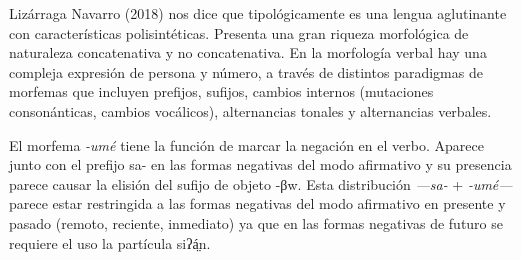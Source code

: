 Lizárraga Navarro (2018) nos dice que tipológicamente es una lengua aglutinante con características polisintéticas. Presenta una gran riqueza morfológica de naturaleza concatenativa y no concatenativa. En la morfología verbal hay una compleja expresión de persona y número, a través de distintos paradigmas de morfemas que incluyen prefijos, sufijos, cambios internos (mutaciones consonánticas, cambios vocálicos), alternancias tonales y alternancias verbales.

El morfema \textit{-umé} tiene la función de marcar la negación en el verbo. Aparece junto con el prefijo sa- en las formas negativas del modo afirmativo y su presencia parece causar la elisión del sufijo de objeto {\setmainfont{Doulos SIL}-βw}. Esta distribución \textit{—sa-} + \textit{-umé—} parece estar restringida a las formas negativas del modo afirmativo en presente y pasado (remoto, reciente, inmediato) ya que en las formas negativas de futuro se requiere el uso la partícula {\setmainfont{Doulos SIL}siʔá̤n.}
